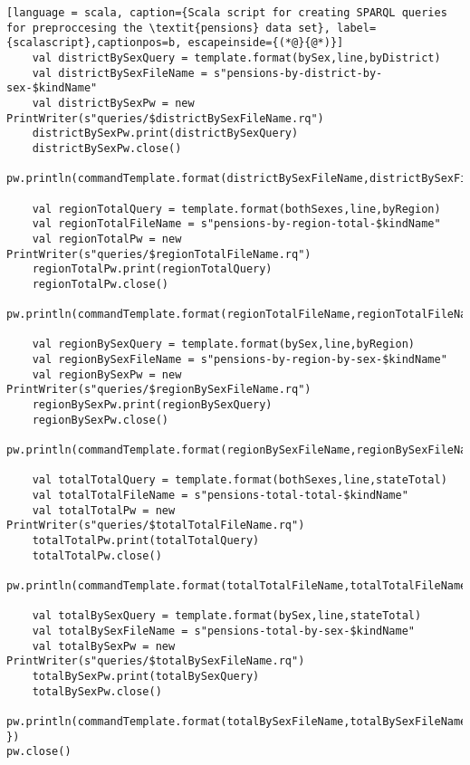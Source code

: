 \begin{lstlisting}[language = scala, caption={Scala script for creating SPARQL queries for preproccesing the \textit{pensions} data set}, label={scalascript},captionpos=b, escapeinside={(*@}{@*)}]
    val districtBySexQuery = template.format(bySex,line,byDistrict)
    val districtBySexFileName = s"pensions-by-district-by-sex-$kindName"
    val districtBySexPw = new PrintWriter(s"queries/$districtBySexFileName.rq")
    districtBySexPw.print(districtBySexQuery)
    districtBySexPw.close()
    pw.println(commandTemplate.format(districtBySexFileName,districtBySexFileName))
    
    val regionTotalQuery = template.format(bothSexes,line,byRegion)
    val regionTotalFileName = s"pensions-by-region-total-$kindName"
    val regionTotalPw = new PrintWriter(s"queries/$regionTotalFileName.rq")
    regionTotalPw.print(regionTotalQuery)
    regionTotalPw.close()
    pw.println(commandTemplate.format(regionTotalFileName,regionTotalFileName))
    
    val regionBySexQuery = template.format(bySex,line,byRegion)
    val regionBySexFileName = s"pensions-by-region-by-sex-$kindName"
    val regionBySexPw = new PrintWriter(s"queries/$regionBySexFileName.rq")
    regionBySexPw.print(regionBySexQuery)
    regionBySexPw.close()
    pw.println(commandTemplate.format(regionBySexFileName,regionBySexFileName))
    
    val totalTotalQuery = template.format(bothSexes,line,stateTotal)
    val totalTotalFileName = s"pensions-total-total-$kindName"
    val totalTotalPw = new PrintWriter(s"queries/$totalTotalFileName.rq")
    totalTotalPw.print(totalTotalQuery)
    totalTotalPw.close()
    pw.println(commandTemplate.format(totalTotalFileName,totalTotalFileName))
    
    val totalBySexQuery = template.format(bySex,line,stateTotal)
    val totalBySexFileName = s"pensions-total-by-sex-$kindName"
    val totalBySexPw = new PrintWriter(s"queries/$totalBySexFileName.rq")
    totalBySexPw.print(totalBySexQuery)
    totalBySexPw.close()
    pw.println(commandTemplate.format(totalBySexFileName,totalBySexFileName))
})
pw.close()
\end{lstlisting}


